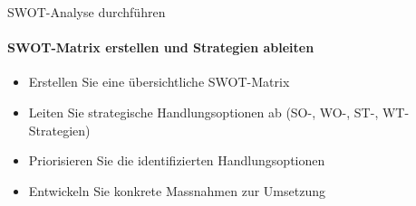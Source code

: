 \begin{KR}{SWOT-Analyse durchführen}
\paragraph{SWOT-Matrix erstellen und Strategien ableiten}
\begin{itemize}
    \item Erstellen Sie eine übersichtliche SWOT-Matrix
    \item Leiten Sie strategische Handlungsoptionen ab (SO-, WO-, ST-, WT-Strategien)
    \item Priorisieren Sie die identifizierten Handlungsoptionen
    \item Entwickeln Sie konkrete Massnahmen zur Umsetzung
\end{itemize}
\end{KR}